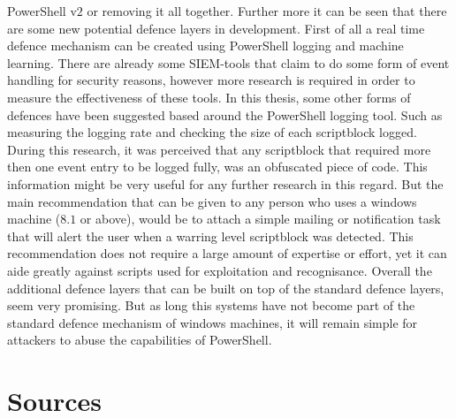 \documentclass{article}%
\begin{document}
PowerShell v$2$ or removing it all together. Further more it can be seen that there are some new potential defence layers in development. First of all a real time defence mechanism can be created using PowerShell logging and machine learning. There are already some SIEM-tools that claim to do some form of event handling for security reasons, however more research is required in order to measure the effectiveness of these tools. In this thesis, some other forms of defences have been suggested based around the PowerShell logging tool. Such as measuring the logging rate and checking the size of each scriptblock logged. During this research, it was perceived that any scriptblock that required more then one event entry to be logged fully, was an obfuscated piece of code. This information might be very useful for any further research in this regard. But the main recommendation that can be given to any person who uses a windows machine ($8.1$ or above), would be to attach a simple mailing or notification task that will alert the user when a warring level scriptblock was detected. This recommendation does not require a large amount of expertise or effort, yet it can aide greatly against scripts used for exploitation and recognisance. Overall the additional defence layers that can be built on top of the standard defence layers, seem very promising. But as long this systems have not become part of the standard defence mechanism of windows machines, it will remain simple for attackers to abuse the capabilities of PowerShell.
\newpage
\section{Sources}
\end{document}
